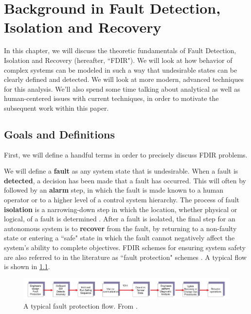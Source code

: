 \chapter{Background in Fault Detection, Isolation and Recovery}

In this chapter, we will discuss the theoretic fundamentals of Fault Detection, Isolation and Recovery (hereafter, ``FDIR"). We will look at how behavior of complex systems can be modeled in such a way that undesirable states can be clearly defined and detected. We will look at more modern, advanced techniques for this analysis. We'll also spend some time talking about analytical as well as human-centered issues with current techniques, in order to motivate the subsequent work within this paper.

\section{Goals and Definitions}

First, we will define a handful terms in order to precisely discuss FDIR problems.

We will define a \textbf{fault} as any system state that is undesirable. When a fault is \textbf{detected}, a decision has been made that a fault has occurred. This will often by followed by an \textbf{alarm} step, in which the fault is made known to a human operator or to a higher level of a control system hierarchy. The process of fault \textbf{isolation} is a narrowing-down step in which the location, whether physical or logical, of a fault is determined \cite{schwabacher2008pre}. After a fault is isolated, the final step for an autonomous system is to \textbf{recover} from the fault, by returning to a non-faulty state or entering a ``safe" state in which the fault cannot negatively affect the system's ability to complete objectives. FDIR schemes for ensuring system safety are also referred to in the literature as ``fault protection" schemes \cite{kurien2010intrinsic}. A typical flow is shown in \ref{fig:fp_flow}.

\begin{figure}[h]
\centering
    \includegraphics[width=\columnwidth]{images/fp_flow.png}
    \caption{A typical fault protection flow. From \cite{kurien2010intrinsic}.}
    \label{fig:fp_flow}
\end{figure}


